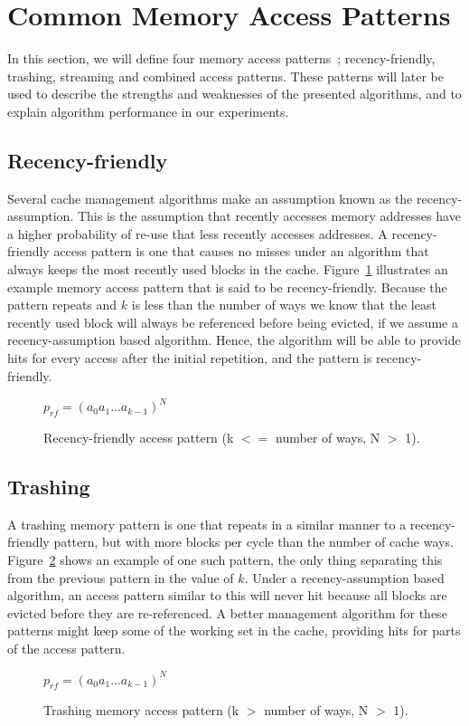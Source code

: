 \section{Common Memory Access Patterns}

In this section, we will define four memory access patterns~\cite{Jaleel2010}; recency-friendly, trashing, streaming and combined access patterns.
These patterns will later be used to describe the strengths and weaknesses of the presented algorithms, and to explain algorithm performance in our experiments.

\subsection{Recency-friendly}
Several cache management algorithms make an assumption known as the recency-assumption.
This is the assumption that recently accesses memory addresses have a higher probability of re-use that less recently accesses addresses.
A recency-friendly access pattern is one that causes no misses under an algorithm that always keeps the most recently used blocks in the cache.
Figure~\ref{fig:algorithms:rf_pattern} illustrates an example memory access pattern that is said to be recency-friendly.
Because the pattern repeats and $k$ is less than the number of ways we know that the least recently used block will always be referenced before being evicted, if we assume a recency-assumption based algorithm.
Hence, the algorithm will be able to provide hits for every access after the initial repetition, and the pattern is recency-friendly.

\begin{figure}[th]
\centering
$p_{rf} = (a_0 a_1 ... a_{k-1})^N$
\caption[Recency-friendly access pattern.]{Recency-friendly access pattern (k $<=$ number of ways, N $>$ 1).}
\label{fig:algorithms:rf_pattern}
\end{figure}

\subsection{Trashing}
A trashing memory pattern is one that repeats in a similar manner to a recency-friendly pattern, but with more blocks per cycle than the number of cache ways. 
Figure~\ref{fig:algorithms:tr_pattern} shows an example of one such pattern, the only thing separating this from the previous pattern in the value of $k$.
Under a recency-assumption based algorithm, an access pattern similar to this will never hit because all blocks are evicted before they are re-referenced.
A better management algorithm for these patterns might keep some of the working set in the cache, providing hits for parts of the access pattern.
\begin{figure}[th]
\centering
$p_{rf} = (a_0 a_1 ... a_{k-1})^N$
\caption[Trashing memory access pattern.]{Trashing memory access pattern (k $>$ number of ways, N $>$ 1).}
\label{fig:algorithms:tr_pattern}
\end{figure}

